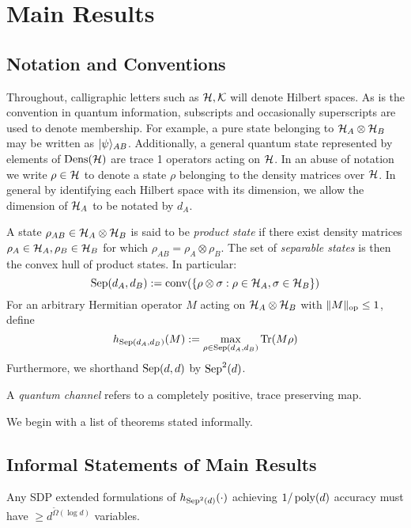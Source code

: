 \documentclass[runningheads,a4paper,english]{llncs}[2022/01/12]
\begin{document}
\section{Main Results}
\label{sec:mainresults}
\subsection{Notation and Conventions}
\label{sec:notation}
Throughout, calligraphic letters such as $\mathcal{H}, \mathcal{K}$ will denote Hilbert spaces.
As is the convention in quantum information, subscripts and occasionally superscripts are used to denote membership.
For example, a pure state belonging to $\mathcal{H}_A \otimes \mathcal{H}_B$ may be written as $\lvert\psi\rangle_{AB}$.
Additionally, a general quantum state represented by elements of $\operatorname{Dens}(\mathcal{H})$ are trace 1 operators acting on $\mathcal{H}$.
In an abuse of notation we write $\rho \in \mathcal{H}$ to denote a state $\rho$ belonging to the density matrices over $\mathcal{H}$.
In general by identifying each Hilbert space with its dimension, we allow the dimension of $\mathcal{H}_A$ to be notated by $d_A$.

A state $\rho_{AB} \in \mathcal{H}_A \otimes \mathcal{H}_B$ is said to be \emph{product state} if there exist density matrices $\rho_A \in \mathcal{H}_A, \rho_B \in \mathcal{H}_B$ for which $\rho_{AB} = \rho_A \otimes \rho_B$.
The set of \emph{separable states} is then the convex hull of product states.
In particular:
\[\operatorname{Sep}(d_A, d_B) := \operatorname{conv}(\{\rho \otimes \sigma : \rho \in \mathcal{H}_A, \sigma \in \mathcal{H}_B\})\]
For an arbitrary Hermitian operator $M$ acting on $\mathcal{H}_A \otimes \mathcal{H}_B$ with $\lVert M\rVert_{\text{op}} \le 1$, define
\[h_{\operatorname{Sep}(d_A, d_B)}(M) := \max_{\rho\in \operatorname{Sep}(d_A, d_B)} \operatorname{Tr}(M\rho)\]
Furthermore, we shorthand $\operatorname{Sep}(d, d)$ by $\operatorname{Sep}^2(d)$.

A \emph{quantum channel} refers to a completely positive, trace preserving map.

We begin with a list of theorems stated informally.
\subsection{Informal Statements of Main Results}
\label{sec:informalmain}
\begin{theorem}\label{thm:1}
Any SDP extended formulations of $h_{\operatorname{Sep}^2(d)}(\cdot)$ achieving $1/\operatorname{poly}(d)$ accuracy must have $\ge d^{\tilde{\Omega}(\log d)}$ variables.
\end{theorem}
\end{document}

